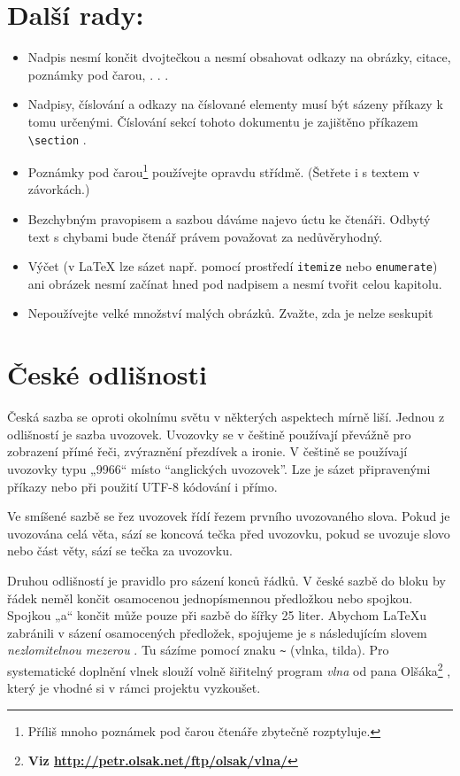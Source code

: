\documentclass[a4paper, twocolumn, 10pt]{article}
\begin{document}
\section{Další rady:}

\begin{itemize}
\item Nadpis nesmí končit dvojtečkou a nesmí obsahovat odkazy na obrázky, citace, poznámky pod čarou, . . .
\item Nadpisy, číslování a odkazy na číslované elementy musí
být sázeny příkazy k tomu určenými. Číslování sekcí
tohoto dokumentu je zajištěno příkazem {\verb|\section|} .
\item Poznámky pod čarou\footnote{Příliš mnoho poznámek pod čarou čtenáře zbytečně rozptyluje.}     používejte opravdu střídmě.
(Šetřete i s textem v závorkách.)
\item Bezchybným pravopisem a sazbou dáváme najevo úctu
ke čtenáři. Odbytý text s chybami bude čtenář právem
považovat za nedůvěryhodný.

\item Výčet (v \LaTeX{} lze sázet např. pomocí prostředí
\texttt{itemize}  nebo \texttt{enumerate}) ani obrázek nesmí začínat
hned pod nadpisem a nesmí tvořit celou kapitolu.

\item  Nepoužívejte velké množství malých obrázků. Zvažte,
zda je nelze seskupit
\end{itemize}

\section{České odlišnosti}

Česká sazba se oproti okolnímu světu v některých aspektech mírně liší. Jednou z odlišností je sazba uvozovek. Uvozovky se v češtině používají převážně pro zobrazení přímé
řeči, zvýraznění přezdívek a ironie. V češtině se používají
uvozovky typu „9966“ místo “anglických uvozovek”. Lze je
sázet připravenými příkazy nebo při použití UTF-8 kódování i přímo.

Ve smíšené sazbě se řez uvozovek řídí řezem prvního uvozovaného slova. Pokud je uvozována celá věta, sází se koncová tečka před uvozovku, pokud se uvozuje slovo nebo část
věty, sází se tečka za uvozovku.

Druhou odlišností je pravidlo pro sázení konců řádků.
V české sazbě do bloku by řádek neměl končit osamocenou jednopísmennou předložkou nebo spojkou. Spojkou
„a“ končit může pouze při sazbě do šířky 25 liter. Abychom
\LaTeX{}u zabránili v sázení osamocených předložek, spojujeme je s následujícím slovem \textit{nezlomitelnou mezerou} . Tu
sázíme pomocí znaku \verb|~| (vlnka, tilda). Pro systematické
doplnění vlnek slouží volně šiřitelný program \textit{vlna} od pana
Olšáka\footnote{\textbf{Viz \url{http://petr.olsak.net/ftp/olsak/vlna/}}}
, který je vhodné si v rámci projektu vyzkoušet.
\end{document}

